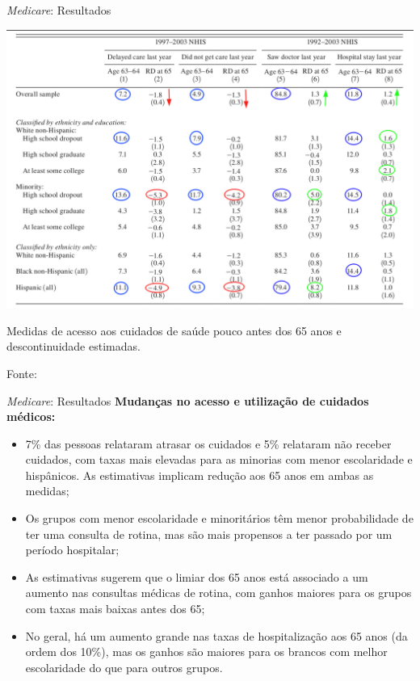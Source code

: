 \documentclass[aspectratio=1610, 10pt]{beamer}
\begin{document}
\begin{frame}{\textit{Medicare}: Resultados}
    \begin{table}
            \centering
            \includegraphics[scale = 0.34]{FigurasAplicacao/tab_consulta_editada.png}
            \vspace{-0.3cm}
            \caption{Medidas de acesso aos cuidados de saúde pouco antes dos 65 anos e descontinuidade estimadas.}
            \tiny{Fonte: \cite{card2008impact}}
            \label{tab_consulta}
        \end{table}
\end{frame}

\begin{frame}{\textit{Medicare}: Resultados}
    \textbf{Mudanças no acesso e utilização de cuidados médicos:}
    \begin{itemize}
        \item 7\% das pessoas relataram atrasar os cuidados e 5\% relataram não receber cuidados, com taxas mais elevadas para as minorias com menor escolaridade e hispânicos. As estimativas implicam redução aos 65 anos em ambas as medidas;
        \item Os grupos com menor escolaridade e minoritários têm menor probabilidade de ter uma consulta de rotina, mas são mais propensos a ter passado por um período hospitalar;
        \item As estimativas sugerem que o limiar dos 65 anos está associado a um aumento nas consultas médicas de rotina, com ganhos maiores para os grupos com taxas mais baixas antes dos 65;
        \item No geral, há um aumento grande nas taxas de hospitalização aos 65 anos (da ordem dos 10\%), mas os ganhos são maiores para os brancos com melhor escolaridade do que para outros grupos.
    \end{itemize}
\end{frame}
\end{document}
